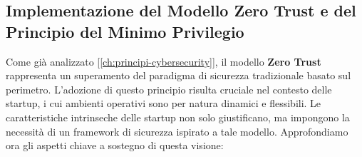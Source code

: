 \subsection{Implementazione del Modello Zero Trust e del Principio del Minimo Privilegio}
\label{sec:zero-trust-implementation}

Come già analizzato [\ref{ch:principi-cybersecurity}], il modello \textbf{Zero Trust} rappresenta un superamento del paradigma di sicurezza tradizionale basato sul perimetro. L'adozione di questo principio risulta cruciale nel contesto delle startup, i cui ambienti operativi sono per natura dinamici e flessibili. Le caratteristiche intrinseche delle startup non solo giustificano, ma impongono la necessità di un framework di sicurezza ispirato a tale modello. Approfondiamo ora gli aspetti chiave a sostegno di questa visione:

